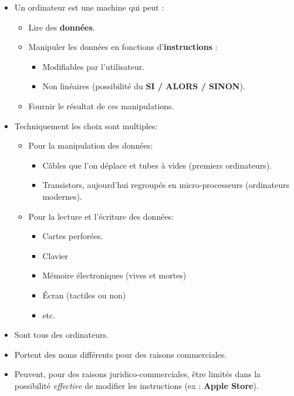 \begin{slide}
	\begin{itemize}
		\item Un ordinateur est une machine qui peut :
			\begin{itemize}
				\item Lire des \textbf{données}. 
				\item Manipuler les données en fonctions d'\textbf{instructions} :
					\begin{itemize}
						\item Modifiables par l'utilisateur.
						\item Non linéaires (possibilité du \textbf{SI / ALORS / SINON}). %
					\end{itemize}
				\item Fournir le résultat de ces manipulations. 
			\end{itemize}
		\item Techniquement les choix sont multiples:
			\begin{itemize}
				\item Pour la manipulation des données:
					\begin{itemize}
						\item Câbles que l'on déplace et tubes à vides (premiers ordinateurs).
						\item Transistors, aujourd'hui regroupés en micro-processeurs (ordinateurs modernes).
					\end{itemize}
				\item Pour la lecture et l'écriture des données:
					\begin{itemize}
						\item Cartes perforées.
						\item Clavier
						\item Mémoire électroniques (vives et mortes)
						\item Écran (tactiles ou non)
						\item etc.
					\end{itemize}
			\end{itemize}
	\end{itemize}
\end{slide}
\begin{slide}
			\begin{itemize}
				\item Sont tous des ordinateurs.
				\item Portent des noms différents pour des raisons commerciales.
				\item Peuvent, pour des raisons juridico-commerciales, être limités dans la possibilité \emph{effective} de modifier les instructions (ex : \textbf{Apple Store}).
			\end{itemize}

\end{slide}

